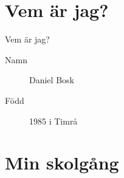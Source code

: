 \mode*

\begin{frame}
  \tableofcontents
\end{frame}

\section{Vem är jag?}


\begin{frame}
  \begin{block}{Vem är jag?}
    \begin{description}
      \item[Namn] Daniel Bosk
      \item[Född] 1985 i Timrå
    \end{description}
  \end{block}
\end{frame}

\section{Min skolgång}

